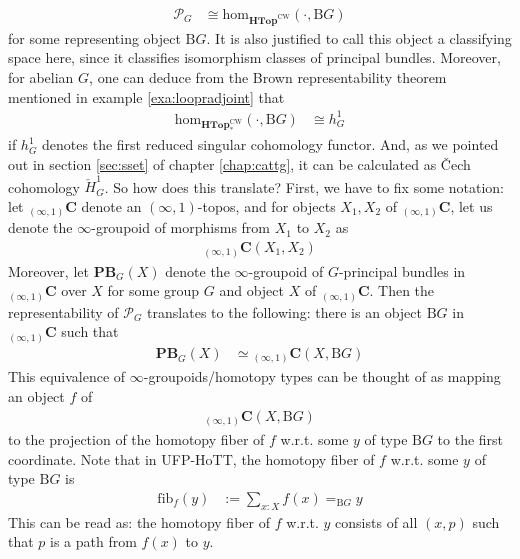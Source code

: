 \begin{align*}
  \mathcal{P}_{G}
  &\cong
  \mathrm{hom}_{\mathbf{HTop}^{\textrm{CW}}}(\cdot,\mathrm{B}G)
\end{align*}
for some representing object $\mathrm{B}G$.
It is also justified to call this object a classifying space here, since it classifies isomorphism classes of principal bundles.
Moreover, for abelian $G$, one can deduce from the Brown representability theorem mentioned in example \ref{exa:loopradjoint} that
\begin{align*}
  \mathrm{hom}_{\mathbf{HTop}_{\ast}^{\textrm{CW}}}(\cdot,\mathrm{B}G)
  &\cong
  h_{G}^{1}
\end{align*}
if $h_{G}^{1}$ denotes the first reduced singular cohomology functor.
And, as we pointed out in section \ref{sec:sset} of chapter \ref{chap:cattg}, it can be calculated as \v{C}ech cohomology $\check{H}_{G}^{1}$.
So how does this translate?
First, we have to fix some notation: let ${}_{(\infty,1)}\mathbf{C}$ denote an $(\infty,1)$-topos, and for objects $X_{1},X_{2}$ of ${}_{(\infty,1)}\mathbf{C}$, let us denote the $\infty$-groupoid of morphisms from $X_{1}$ to $X_{2}$ as
\begin{align*}
  {}_{(\infty,1)}\mathbf{C}
  \left(
    X_{1},
    X_{2}
  \right)
\end{align*}
Moreover, let $\mathbf{PB}_{G}(X)$ denote the $\infty$-groupoid of $G$-principal bundles in ${}_{(\infty,1)}\mathbf{C}$ over $X$ for some group $G$ and object $X$ of ${}_{(\infty,1)}\mathbf{C}$.
Then the representability of $\mathcal{P}_{G}$ translates to the following: there is an object $\mathrm{B}G$ in ${}_{(\infty,1)}\mathbf{C}$ such that
\begin{align*}
  \mathbf{PB}_{G}(X)
  &\simeq
  {}_{(\infty,1)}\mathbf{C}
  \left(
    X,
    \mathrm{B}G
  \right)
\end{align*}
This equivalence of $\infty$-groupoids/homotopy types can be thought of as mapping an object $f$ of
\begin{align*}
  {}_{(\infty,1)}\mathbf{C}
  \left(
    X,
    \mathrm{B}G
  \right)
\end{align*}
to the projection of the homotopy fiber of $f$ w.r.t.
some $y$ of type $\mathrm{B}G$ to the first coordinate.
Note that in UFP-HoTT, the homotopy fiber of $f$ w.r.t.
some $y$ of type $\mathrm{B}G$ is
\begin{align*}
  \mathrm{fib}_{f}(y)
  &:=
  \sum_{x \colon X}
  f(x)
  =_{\mathrm{B}G}
  y
\end{align*}
This can be read as: the homotopy fiber of $f$ w.r.t. $y$ consists of all $(x,p)$ such that $p$ is a path from $f(x)$ to $y$.

